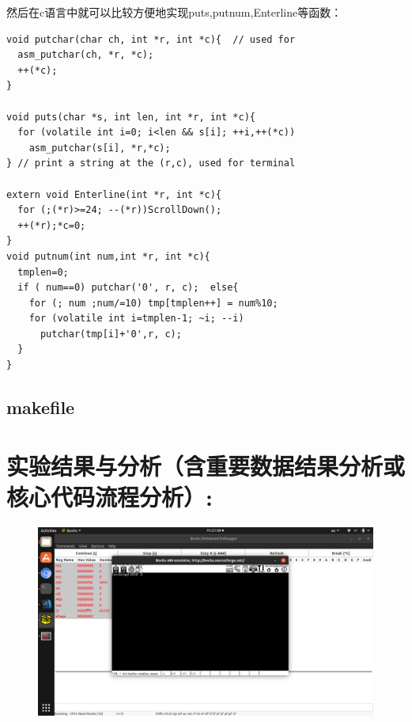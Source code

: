 \documentclass[a4paper,11pt,UTF8]{ctexart}
\newcommand{\bottomcaption}{%
\setlength{\abovecaptionskip}{6pt}%
\setlength{\belowcaptionskip}{6pt}%
\caption}
\newcommand{\xiaowuhao}{\fontsize{9pt}{\baselineskip}\selectfont}   %
\begin{document}
      然后在c语言中就可以比较方便地实现puts,putnum,Enterline等函数：
      \begin{lstlisting}[caption={一段C代码},captionpos=b]
void putchar(char ch, int *r, int *c){  // used for
  asm_putchar(ch, *r, *c);
  ++(*c);
}

void puts(char *s, int len, int *r, int *c){
  for (volatile int i=0; i<len && s[i]; ++i,++(*c))
    asm_putchar(s[i], *r,*c);
} // print a string at the (r,c), used for terminal 

extern void Enterline(int *r, int *c){
  for (;(*r)>=24; --(*r))ScrollDown();
  ++(*r);*c=0;
}
void putnum(int num,int *r, int *c){
  tmplen=0;
  if ( num==0) putchar('0', r, c);	else{
    for (; num ;num/=10) tmp[tmplen++] = num%10;
    for (volatile int i=tmplen-1; ~i; --i)
      putchar(tmp[i]+'0',r, c);
  }
}
      \end{lstlisting}
      \subsection{makefile}

\section{实验结果与分析（含重要数据结果分析或核心代码流程分析）:}

\begin{figure}[!htbp]
  \centering
  \includegraphics[width=\textwidth]{imgs/Screenshot_from_2019-03-29_21-09-42.png}
  \bottomcaption{\xiaowuhao{打开程序显示命令行}}
  \end{figure}
  
\end{document}
